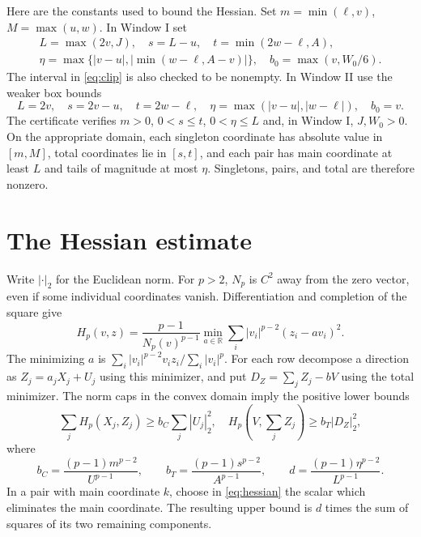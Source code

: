 \documentclass[11pt,a4paper]{article}
\theoremstyle{remark}\newtheorem{remark}[theorem]{Remark}
\newcommand{\R}{\mathbb R}\newcommand{\C}{\mathbb C}
\newcommand{\Np}{N_p}\newcommand{\F}{F_{p,K}}
\begin{document}
Here are the constants used to bound the Hessian. Set $m=\min(\ell,v)$,
$M=\max(u,w)$. In Window I set
\begin{equation}\label{eq:geo1}
\begin{gathered}
L=\max(2v,J),\quad s=L-u,\quad t=\min(2w-\ell,A),\\
\eta=\max\{|v-u|,|\min(w-\ell,A-v)|\},\quad b_0=\max(v,W_0/6).
\end{gathered}
\end{equation}
The interval in \eqref{eq:clip} is also checked to be nonempty.
In Window II use the weaker box bounds
\begin{equation}\label{eq:geo2}
L=2v,\quad s=2v-u,\quad t=2w-\ell,\quad
\eta=\max(|v-u|,|w-\ell|),\quad b_0=v.
\end{equation}
The certificate verifies $m>0$, $0<s\le t$, $0<\eta\le L$ and,
in Window I, $J,W_0>0$. On the appropriate domain, each singleton
coordinate has absolute value in $[m,M]$, total coordinates lie in $[s,t]$,
and each pair has main coordinate at least $L$ and tails of magnitude
at most $\eta$. Singletons, pairs, and total are therefore nonzero.

\section{The Hessian estimate}\label{sec:hessian}
Write $|\cdot|_2$ for the Euclidean norm. For $p>2$, $\Np$ is $C^2$
away from the zero vector, even if some individual coordinates vanish.
Differentiation and completion of the square give
\begin{equation}\label{eq:hessian}
H_p(v,z)=\frac{p-1}{\Np(v)^{p-1}}
\min_{a\in\R}\sum_i|v_i|^{p-2}(z_i-av_i)^2.
\end{equation}
The minimizing $a$ is
$\sum_i|v_i|^{p-2}v_iz_i/\sum_i|v_i|^p$.
For each row decompose a direction as $Z_j=a_jX_j+U_j$ using this
minimizer, and put $D_Z=\sum_j Z_j-bV$ using the total minimizer.
The norm caps in the convex domain imply the positive lower bounds
\begin{equation}\label{eq:positivehess}
\sum_jH_p(X_j,Z_j)\ge b_C\sum_j|U_j|_2^2,\quad
H_p(V,\sum_jZ_j)\ge b_T|D_Z|_2^2,
\end{equation}
where
\[
b_C=\frac{(p-1)m^{p-2}}{U^{p-1}},\qquad
b_T=\frac{(p-1)s^{p-2}}{A^{p-1}},\qquad
d=\frac{(p-1)\eta^{p-2}}{L^{p-1}}.
\]
In a pair with main coordinate $k$, choose in \eqref{eq:hessian} the
scalar which eliminates the main coordinate. The resulting upper bound
is $d$ times the sum of squares of its two remaining components.
\end{document}
